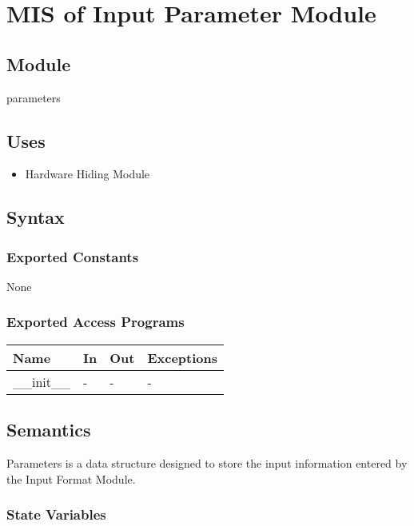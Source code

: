 \documentclass[12pt, titlepage]{article}
\begin{document}
\newpage
\section{MIS of Input Parameter Module} \label{Input_Parameter_Module} 

\subsection{Module}

parameters

\subsection{Uses}

\begin{itemize}
    \item Hardware Hiding Module
\end{itemize}

\subsection{Syntax}

\subsubsection{Exported Constants}
None 

\subsubsection{Exported Access Programs}

\begin{center}
\begin{tabular}{p{2cm} p{4cm} p{4cm} p{2cm}}
\hline
\textbf{Name} & \textbf{In} & \textbf{Out} & \textbf{Exceptions} \\
\hline
\_\_init\_\_  & - & - & - \\
\hline
\end{tabular}
\end{center}

\subsection{Semantics}
Parameters is a data structure designed to store the input information entered by the Input Format Module. 
\subsubsection{State Variables}
\end{document}
